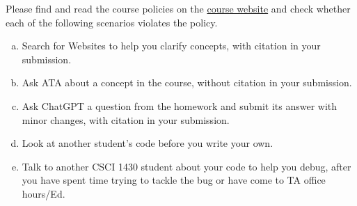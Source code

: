 \documentclass{csci1430}
\begin{document}
\pagebreak %

\begin{question}[points=4]
Please find and read the course policies on the \href{https://browncsci1430.github.io/}{course website} and check whether each of the following scenarios violates the policy.
\end{question}

\begin{enumerate}[(a)]
\item
Search for Websites to help you clarify concepts, with citation in your submission.


\item 
Ask ATA about a concept in the course, without citation in your submission.


\item 
Ask ChatGPT a question from the homework and submit its answer with minor changes, with citation in your submission.


\item 
Look at another student's code before you write your own.


\item
Talk to another CSCI 1430 student about your code to help you debug, after you have spent time trying to tackle the bug or have come to TA office hours/Ed.


\end{enumerate}
\end{document}
